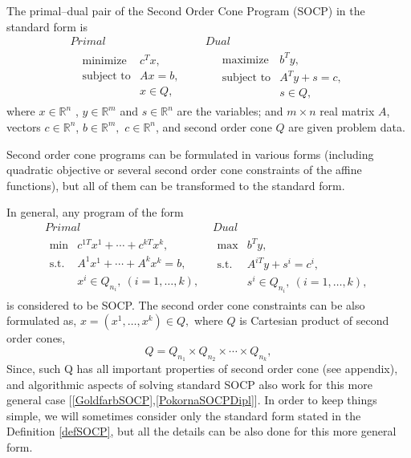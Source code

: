 \documentclass[10pt,oneside]{book}
\theoremstyle{definition}
\begin{document}
\label{defSOCP}
The primal--dual pair of the Second Order Cone Program (SOCP) in the standard form is
\begin{equation}
\label{socp} 
\begin{array}{cc}
Primal & Dual \\
\ \ \ \begin{array}{ll}
\mbox{minimize} & c^Tx,\\
\mbox{subject to}& Ax = b,\\
& x \in Q,
\end{array} 
 \ \ \ \ \ & \ \ \ \ \ 
 \begin{array}{ll}
\mbox{maximize} & b^Ty,\\
\mbox{subject to}& A^Ty + s = c,\\
& s \in Q,
\end{array}
\end{array}
\end{equation}
where $x\in \mathbb{R}^n$ , $y\in \mathbb{R}^m$ and $s\in \mathbb{R}^n$ are the variables; and $m\times n$ real matrix $A$, vectors $c\in \mathbb{R}^n$, $b\in \mathbb{R}^{m},$ $c\in \mathbb{R}^n$, and second order cone $Q$ are given problem data.

\rem Second order cone programs can be formulated in various forms (including quadratic objective or several second order cone constraints of the affine functions), but all of them can be transformed to the standard form. 

\rem In general, any program of the form 
\begin{equation}
\begin{array}{cc}
Primal & Dual \\
\begin{array}{ll}
\mbox{min} &  c^{1T}x^1+\cdots + c^{kT}x^k,\\
\mbox{s.t.}& A^1x^1+ \cdots + A^kx^k = b, \\
& x^i \in Q_{n_i}, \ (i = 1,\dots ,k),
\end{array} 
 & 
 \begin{array}{ll}
\mbox{max} & b^Ty,\\
\mbox{s.t.}& A^{iT}y + s^i = c^i, \\ %
& s^i \in Q_{n_i}, \ (i = 1,\dots ,k),
\end{array}
\end{array}
\label{genSOCP}
\end{equation}
is considered to be SOCP.
The second order cone constraints can be also formulated as, $x = (x^1,\dots ,x^k) \in Q,$ where $Q$ is Cartesian product of second order cones, 
\begin{equation}
Q = Q_{n_1}\times Q_{n_2}\times \cdots \times Q_{n_k},
\end{equation}
 Since, such Q has all important properties of second order cone (see appendix), 
and algorithmic aspects of solving standard SOCP also work for this more general case [\ref{GoldfarbSOCP},\ref{PokornaSOCPDipl}].
In order to keep things simple, we will sometimes consider only the standard form stated in the Definition \ref{defSOCP},
but all the details can be also done for this more general form.
\end{document}
